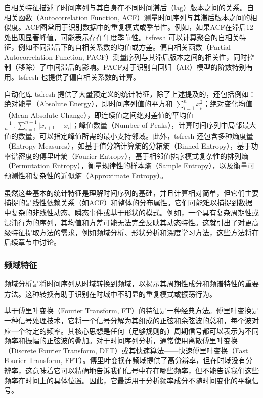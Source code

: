 自相关特征\cite{barnard2001embedding}描述了时间序列与其自身在不同时间滞后（lag）版本之间的关系。自相关函数（Autocorrelation Function, ACF）测量时间序列与其滞后版本之间的相似度。ACF图常用于识别数据中的重复模式或季节性。例如，如果ACF在滞后12处出现显著峰值，可能表示存在年度季节性。tsfresh 可以计算聚合的自相关特征，例如不同滞后下的自相关系数的均值或方差。偏自相关函数（Partial Autocorrelation Function, PACF）测量序列与其滞后版本之间的相关性，同时控制（移除）了中间滞后的影响。PACF对于识别自回归（AR）模型的阶数特别有用。tsfresh 也提供了偏自相关系数的计算。


自动化库 tsfresh 提供了大量预定义的统计特征，除了上述提及的，还包括例如：绝对能量（Absolute Energy），即时间序列值的平方和 $\sum_{i=1}^{n} x_i^2$；绝对变化均值（Mean Absolute Change），即连续值之间绝对差值的平均值 $\frac{1}{n-1}\sum_{i=1}^{n-1} \lvert x_{i+1} - x_i \rvert$；峰值数量（Number of Peaks），计算时间序列中局部最大值的数量，可以指定峰值所需的最小支持邻域。此外，tsfresh 还包含多种熵度量（Entropy Measures），如基于值分箱计算熵的分箱熵（Binned Entropy），基于功率谱密度的傅里叶熵（Fourier Entropy），基于相邻值排序模式复杂性的排列熵（Permutation Entropy），衡量规律性的样本熵（Sample Entropy），以及衡量可预测性和复杂性的近似熵（Approximate Entropy）。

虽然这些基本的统计特征是理解时间序列的基础，并且计算相对简单，但它们主要捕捉的是线性依赖关系（如ACF）和整体的分布属性。它们可能难以捕捉到数据中复杂的非线性动态、瞬态事件或基于形状的模式。例如，一个具有复杂周期性或混沌行为的序列，其均值和方差可能无法完全反映其动态特性。这就引出了对更高级特征提取方法的需求，例如频域分析、形状分析和深度学习方法，这些方法将在后续章节中讨论。

\subsubsection{频域特征}
\label{sec:ts_statistical_spectral}
频域分析\cite{yi2023survey}是将时间序列从时域转换到频域，以揭示其周期性成分和频谱特性的重要方法。这种转换有助于识别在时域中不明显的重复模式或振荡行为。

基于傅里叶变换（Fourier Transform, FT）的特征是一种经典方法。傅里叶变换是一种信号处理技术，它将一个信号分解为其组成的正弦和余弦波的总和，每个波对应一个特定的频率。其核心思想是任何（足够规则的）周期信号都可以表示为不同频率和振幅的正弦波的叠加。对于时间序列分析，通常使用离散傅里叶变换（Discrete Fourier Transform, DFT）或其快速算法——快速傅里叶变换（Fast Fourier Transform, FFT）。傅里叶变换在频域提供了高分辨率，但在时域没有分辨率，这意味着它可以精确地告诉我们信号中存在哪些频率，但不能告诉我们这些频率在时间上的具体位置。因此，它最适用于分析频率成分不随时间变化的平稳信号。

